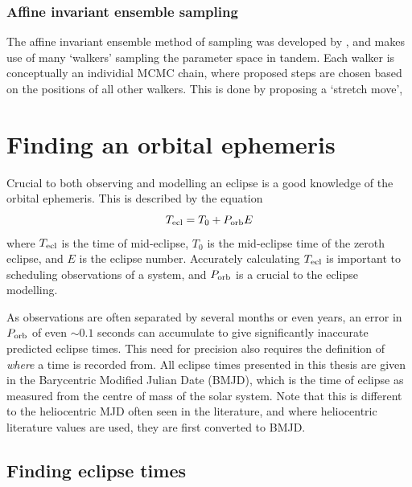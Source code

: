 \subsubsection{Affine invariant ensemble sampling}
The affine invariant ensemble method of sampling was developed by \citet{goodman2010}, and makes use of many `walkers' sampling the parameter space in tandem.
Each walker is conceptually an individial MCMC chain, where proposed steps are chosen based on the positions of all other walkers. This is done by proposing a `stretch move',



\section{Finding an orbital ephemeris}
\label{sect:modelling:getting ephemeris}

Crucial to both observing and modelling an eclipse is a good knowledge of the orbital ephemeris. This is described by the equation
\begin{equation}
    \label{eqn:modelling:general ephemeris equation}
    T_{\rm ecl} = T_0 + P_{\rm orb} E
\end{equation}
where $T_{\rm ecl}$ is the time of mid-eclipse, $T_0$ is the mid-eclipse time of the zeroth eclipse, and $E$ is the eclipse number. Accurately calculating $T_{\rm ecl}$ is important to scheduling observations of a system, and $P_{\rm orb}$ is a crucial to the eclipse modelling.

As observations are often separated by several months or even years, an error in $P_{\rm orb}$ of even $\sim 0.1$ seconds can accumulate to give significantly inaccurate predicted eclipse times. This need for precision also requires the definition of {\it where} a time is recorded from. All eclipse times presented in this thesis are given in the Barycentric Modified Julian Date (BMJD), which is the time of eclipse as measured from the centre of mass of the solar system. Note that this is different to the heliocentric MJD often seen in the literature, and where heliocentric literature values are used, they are first converted to BMJD.

\subsection{Finding eclipse times}
\label{sect:modelling:finding eclipse times}

